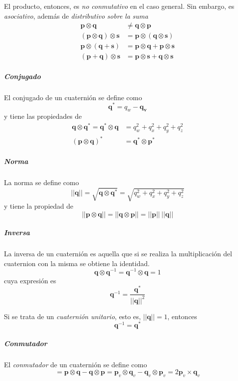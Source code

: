 El producto, entonces, es \textit{no conmutativo} en el caso general. Sin embargo, es \textit{asociativo}, además de \textit{distributivo sobre la suma}
\begin{align}
    \bm{p}\otimes\bm{q} &\neq \bm{q}\otimes\bm{p} \\
    (\bm{p}\otimes\bm{q})\otimes\bm{s} &= \bm{p}\otimes(\bm{q}\otimes\bm{s}) \\
    \bm{p}\otimes(\bm{q} + \bm{s}) &= \bm{p}\otimes\bm{q} + \bm{p}\otimes\bm{s} \\
    (\bm{p} + \bm{q})\otimes\bm{s} &= \bm{p}\otimes\bm{s} + \bm{q}\otimes\bm{s}
\end{align}
\subparagraph{Conjugado}
El conjugado de un cuaternión se define como
\begin{equation}
    \bm{q}^* = q_w - \bm{q_v}
\end{equation}
y tiene las propiedades de
\begin{align}
    \bm{q}\otimes\bm{q}^* = \bm{q^*}\otimes\bm{q} &= q_w^2 + q_x^2 + q_y^2 + q_z^2 \\
    (\bm{p}\otimes\bm{q})^* &= \bm{q}^*\otimes\bm{p}^*
\end{align}

\subparagraph{Norma}
La norma se define como
\begin{equation}
    ||\bm{q}|| = \sqrt{\bm{q}\otimes\bm{q}^*} = \sqrt{q_w^2 + q_x^2 + q_y^2 + q_z^2}
\end{equation}
y tiene la propiedad de
\begin{equation}
    ||\bm{p}\otimes\bm{q}|| = ||\bm{q}\otimes\bm{p}|| = ||\bm{p}|| \ ||\bm{q}||
\end{equation}

\subparagraph{Inversa}
La inversa de un cuaternión es aquella que si se realiza la multiplicación del cuaternion con la misma se obtiene la identidad.
\begin{equation}
    \bm{q}\otimes\bm{q}^{-1} = \bm{q}^{-1}\otimes\bm{q} = 1
    \label{eq:quaternioninverse}
\end{equation}
cuya expresión es
\begin{equation}
    \bm{q}^{-1} = \frac{\bm{q}^*}{||\bm{q}||^2}
\end{equation}

Si se trata de un \textit{cuaternión unitario}, esto es, $||\bm{q}|| = 1$, entonces
\begin{equation}
    \bm{q}^{-1} = \bm{q}^*    
\end{equation}

\subparagraph{Conmutador}
El \textit{conmutador} de un cuaternión se define como
\begin{equation}
    [\bm{p},\bm{q}] = \bm{p}\otimes\bm{q} - \bm{q}\otimes\bm{p} = \bm{p}_v\otimes\bm{q}_v - \bm{q}_v\otimes\bm{p}_v = 2\bm{p}_v\times\bm{q}_v
    \label{eq:quaternioncommutator}
\end{equation}

